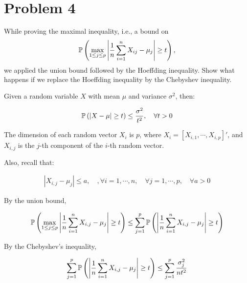 \section*{Problem 4}
\begin{myanswerbox}
While proving the maximal inequality, i.e., a bound on
\[ 
    \mathbb{P}\left(
        \max_{1 \leq j \leq p} \left| \frac{1}{n} \sum_{i=1}^{n} X_{ij} - \mu_j \right| \geq t 
    \right), 
\]
we applied the union bound followed by the Hoeffding inequality. Show what happens if we replace the Hoeffding inequality by the Chebyshev inequality.
\end{myanswerbox}
\begin{theorem}
    Given a random variable $X$ with mean $\mu$ and variance $\sigma^2$, then:

    \begin{align*}
    \mathbb{P}\left(|X - \mu| \geq t\right) \leq \frac{\sigma^2}{t^2}, \quad \forall t > 0
    \end{align*}
\end{theorem}

The dimension of each random vector $X_i$ is $p$, where $X_i = [X_{i,1}, \cdots, X_{i,p}]'$, and $X_{i,j}$ is the $j$-th component of the $i$-th random vector. 

Also, recall that:

\begin{align*}
    |X_{i,j} - \mu_{j}| \leq a, \quad, \forall i = 1, \cdots, n, \quad \forall j = 1, \cdots, p, \quad \forall a > 0
\end{align*}


By the union bound,

\begin{align*}
\mathbb{P}\left(
    \max_{1 \leq j \leq p}{
        \left|
            \frac{1}{n} \sum_{i=1}^{n} X_{i,j} - \mu_{j}
        \right|
    }
    \geq
    t
\right)
\leq
\sum_{j=1}^{p} \mathbb{P}\left(
    \left|
        \frac{1}{n} \sum_{i=1}^{n} X_{i,j} - \mu_{j}
    \right|
    \geq
    t
\right)
\end{align*}

By the Chebyshev's inequality,

\begin{align*}
\sum_{j=1}^{p} \mathbb{P}\left(
    \left|
        \frac{1}{n} \sum_{i=1}^{n} X_{i,j} - \mu_{j}
    \right|
    \geq
    t
\right)
\leq
\sum_{j=1}^{p} \frac{\sigma_j^2}{n t^2}
\end{align*}

